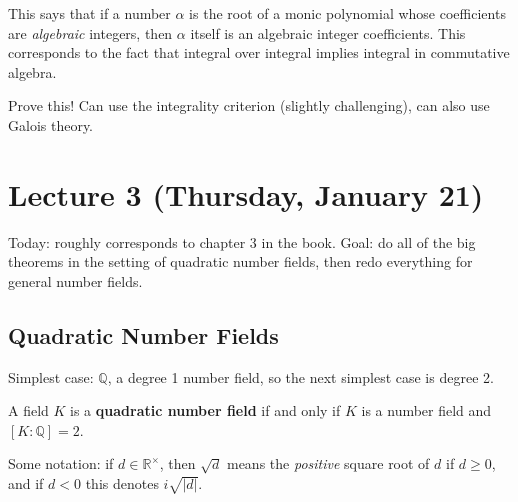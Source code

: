 \begin{remark}

This says that if a number \(\alpha\) is the root of a monic polynomial
whose coefficients are \emph{algebraic} integers, then \(\alpha\) itself
is an algebraic integer coefficients. This corresponds to the fact that
integral over integral implies integral in commutative algebra.

\end{remark}

\begin{exercise}

Prove this! Can use the integrality criterion (slightly challenging),
can also use Galois theory.

\end{exercise}

\hypertarget{lecture-3-thursday-january-21}{%
\section{Lecture 3 (Thursday, January
21)}\label{lecture-3-thursday-january-21}}

Today: roughly corresponds to chapter 3 in the book. Goal: do all of the
big theorems in the setting of quadratic number fields, then redo
everything for general number fields.

\hypertarget{quadratic-number-fields}{%
\subsection{Quadratic Number Fields}\label{quadratic-number-fields}}

Simplest case: \({\mathbb{Q}}\), a degree 1 number field, so the next
simplest case is degree 2.

\begin{definition}

A field \(K\) is a \textbf{quadratic number field} if and only if \(K\)
is a number field and \([K: {\mathbb{Q}}] = 2\).

\end{definition}

\begin{remark}

Some notation: if \(d\in {\mathbb{R}}^{\times}\), then \(\sqrt d\) means
the \emph{positive} square root of \(d\) if \(d \geq 0\), and if \(d<0\)
this denotes \(i\sqrt{{\left\lvert {d} \right\rvert}}\).

\end{remark}


